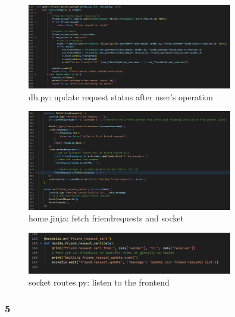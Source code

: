 \documentclass[12pt]{article}
\begin{document}
        \begin{figure}[H]
                \centering
                \includegraphics[width=0.8\textwidth]{zzrgraphs/db_update_request_status.png}
                \caption{db.py: update request status after user's operation}
                \label{updatestatus}
            \end{figure}

        \begin{figure}[H]
                \centering
                \includegraphics[width=0.8\textwidth]{zzrgraphs/home_fetchfriendrequests.png}
                \caption{home.jinja: fetch friendrequests and socket}
                \label{fetchrequests}
            \end{figure}
    
        \begin{figure}[H]
                \centering
                \includegraphics[width=0.8\textwidth]{zzrgraphs/socket_friend_request_sent.png}
                \caption{socket routes.py: listen to the frontend}
                \label{requestsocketio}
            \end{figure}

        \subsubsection*{5} 
\end{document}
